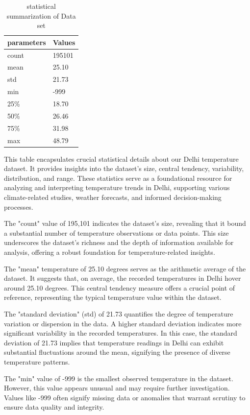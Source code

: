 \documentclass[sn-mathphys,Numbered]{sn-jnl}
\theoremstyle{thmstyleone}
\theoremstyle{thmstyletwo}
\theoremstyle{thmstylethree}
\begin{document}
\begin{table}[h!]
  \caption{statistical summarization of Data set}
  \label{tab: statistical_data_explore }
  \begin{tabular}{ll}
  \hline parameters & Values        \\ \hline
  count & 195101 \\
mean  & 25.10    \\
std   & 21.73     \\
min   & -999   \\
25\%  & 18.70     \\
50\%  & 26.46     \\
75\%  & 31.98     \\
max   & 48.79 \\ \hline
  \end{tabular}
  \end{table}
This table encapsulates crucial statistical details about our Delhi temperature dataset. It provides insights into the dataset's size, central tendency, variability, distribution, and range. These statistics serve as a foundational resource for analyzing and interpreting temperature trends in Delhi, supporting various climate-related studies, weather forecasts, and informed decision-making processes.

The "count" value of 195,101 indicates the dataset's size, revealing that it bound a substantial number of temperature observations or data points. This size underscores the dataset's richness and the depth of information available for analysis, offering a robust foundation for temperature-related insights.

The "mean" temperature of 25.10 degrees serves as the arithmetic average of the dataset. It suggests that, on average, the recorded temperatures in Delhi hover around 25.10 degrees. This central tendency measure offers a crucial point of reference, representing the typical temperature value within the dataset.

The "standard deviation" (std) of 21.73 quantifies the degree of temperature variation or dispersion in the data. A higher standard deviation indicates more significant variability in the recorded temperatures. In this case, the standard deviation of 21.73 implies that temperature readings in Delhi can exhibit substantial fluctuations around the mean, signifying the presence of diverse temperature patterns.

The "min" value of -999 is the smallest observed temperature in the dataset. However, this value appears unusual and may require further investigation. Values like -999 often signify missing data or anomalies that warrant scrutiny to ensure data quality and integrity.
\end{document}

